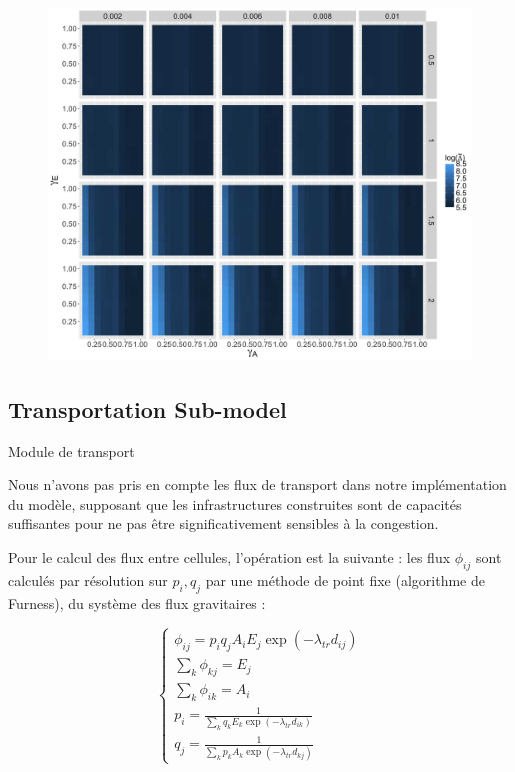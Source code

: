 \begin{figure}
	\includegraphics[width=\linewidth]{Figures/Final/A-lutecia-ludiff.jpg}
\end{figure}





\subsection{Transportation Sub-model}{Module de transport}

Nous n'avons pas pris en compte les flux de transport dans notre implémentation du modèle, supposant que les infrastructures construites sont de capacités suffisantes pour ne pas être significativement sensibles à la congestion.


Pour le calcul des flux entre cellules, l'opération est la suivante : les flux $\phi_{ij}$ sont calculés par résolution sur $p_i,q_j$ par une méthode de point fixe (algorithme de Furness), du système des flux gravitaires :


\[
\begin{cases}
\phi_{ij} = p_i q_j A_i E_j \exp{\left(-\lambda_{tr} d_{ij}\right)}\\
\sum_k \phi_{kj} = E_j\\
\sum_k \phi_{ik} = A_i\\
p_i = \frac{1}{\sum_k{q_k E_k \exp{(-\lambda_{tr}d_{ik})}}}\\
q_j = \frac{1}{\sum_k{p_k A_k \exp{(-\lambda_{tr}d_{kj})}}} 
\end{cases}
\]

